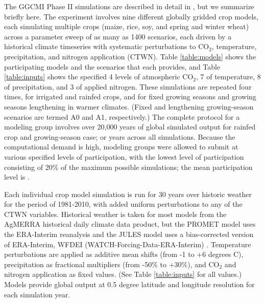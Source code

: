 \documentclass[gmd, manuscript]{copernicus} %
\begin{document}
The GGCMI Phase II simulations %
are described in detail in \citet{Franke2019a}, but we summarize briefly here. 
The experiment involves nine different globally gridded crop models, each simulating multiple crops (maize, rice, soy, and spring and winter wheat) across a parameter sweep of as many as 1400 scenarios, each driven by a historical climate timeseries with systematic perturbations to CO$_2$, temperature, precipitation, and nitrogen application (CTWN). 
Table \ref{table:models} shows the participating models and the scenarios that each provides, and Table \ref{table:inputs} shows the specified 4 levels of atmospheric CO$_2$, 7 of temperature, 8 of precipitation, and 3 of applied nitrogen. 
These simulations are repeated four times, for irrigated and rainfed crops, and for fixed growing seasons and growing seasons lengthening in warmer climates. 
(Fixed and lengthening growing-season scenarios are termed A0 and A1, respectively.) 
The complete protocol for a modeling group involves over 20,000 years of global simulated output for rainfed crop and growing-season case; or  years across all simulations. 
Because the computational demand is high, modeling groups were allowed to submit at various specified levels of participation, with the lowest level of participation consisting of 20\% of the maximum possible simulations; the mean participation level is .

Each individual crop model simulation is run for 30 years over historic weather for the period of 1981-2010, with added uniform perturbations to any of the CTWN variables.
Historical weather is taken for most models from the AgMERRA \citep{Ruane2015} historical daily climate data product, but the PROMET model uses the ERA-Interim reanalysis \citep{dee2011era} and the JULES model uses a bias-corrected version of ERA-Interim, WFDEI (WATCH-Forcing-Data-ERA-Interim) \citep{weedon2014wfdei}. 
Temperature perturbations are applied as additive mean shifts (from -1 to +6 degrees C), precipitation as fractional multipliers (from -50\% to +30\%), and CO$_2$ and nitrogen application as fixed values. (See Table \ref{table:inputs} for all values.)
Models provide global output at 0.5 degree latitude and longitude resolution for each simulation year.

\end{document}
